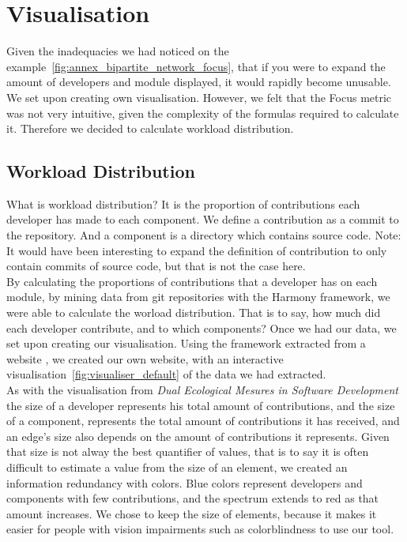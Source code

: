 \section{Visualisation}

Given the inadequacies we had noticed on the example~\ref{fig:annex_bipartite_network_focus}, that if you were to expand the amount of developers and module displayed, it would rapidly become unusable. We set upon creating own visualisation.
However, we felt that the Focus metric was not very intuitive, given the complexity of the formulas required to calculate it. Therefore we decided to calculate workload distribution.

\subsection{Workload Distribution}

What is workload distribution?
It is the proportion of contributions each developer has made to each component.
We define a contribution as a commit to the repository.
And a component is a directory which contains source code.
Note: It would have been interesting to expand the definition of contribution to only contain commits of source code, but that is not the case here.\\

By calculating the proportions of contributions that a developer has on each module, by mining data from git repositories with the Harmony\cite{Harmony} framework, we were able to calculate the worload distribution. That is to say, how much did each developer contribute, and to which components?
Once we had our data, we set upon creating our visualisation. Using the framework extracted from a website \cite{peoplemovin}, we created our own website, with an interactive visualisation~\ref{fig:visualiser_default} of the data we had extracted.\\[0.3cm]
As with the visualisation from \emph{Dual Ecological Mesures in Software Development}\cite{Posnett} the size of a developer represents his total amount of contributions, and the size of a component, represents the total amount of contributions it has received, and an edge's size also depends on the amount of contributions it represents.
Given that size is not alway the best quantifier of values, that is to say it is often difficult to estimate a value from the size of an element, we created an information redundancy with colors. Blue colors represent developers and components with few contributions, and the spectrum extends to red as that amount increases.
We chose to keep the size of elements, because it makes it easier for people with vision impairments such as colorblindness to use our tool.\\

